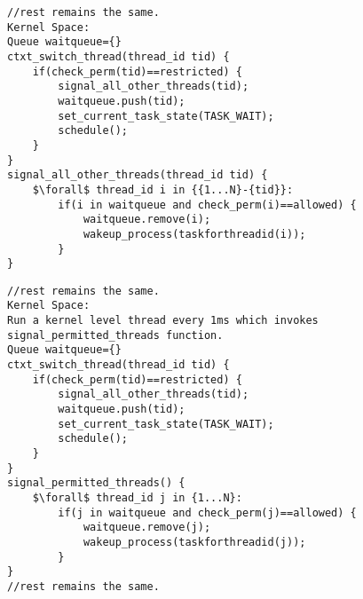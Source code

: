 \begin{lstlisting}[mathescape=true,caption={Pseudo Code for Prototype 3}, style=customc,frame=tlrb,label={lst:proto3}]
//rest remains the same.
Kernel Space:
Queue waitqueue={}
ctxt_switch_thread(thread_id tid) {	
	if(check_perm(tid)==restricted) {
		signal_all_other_threads(tid);
		waitqueue.push(tid);
		set_current_task_state(TASK_WAIT);
		schedule();
	}
}
signal_all_other_threads(thread_id tid) {
	$\forall$ thread_id i in {{1...N}-{tid}}:
		if(i in waitqueue and check_perm(i)==allowed) {
			waitqueue.remove(i);
			wakeup_process(taskforthreadid(i));
		}
}
\end{lstlisting} 
\begin{lstlisting}[mathescape=true,caption={Pseudo Code for Prototype 4}, style=customc,frame=tlrb,label={lst:proto4}]
//rest remains the same.
Kernel Space:
Run a kernel level thread every 1ms which invokes signal_permitted_threads function.
Queue waitqueue={}
ctxt_switch_thread(thread_id tid) {	
	if(check_perm(tid)==restricted) {	
		signal_all_other_threads(tid);
		waitqueue.push(tid);
		set_current_task_state(TASK_WAIT);
		schedule();
	}
}
signal_permitted_threads() {
	$\forall$ thread_id j in {1...N}:
		if(j in waitqueue and check_perm(j)==allowed) {
			waitqueue.remove(j);
			wakeup_process(taskforthreadid(j));
		}
}
//rest remains the same.
\end{lstlisting}